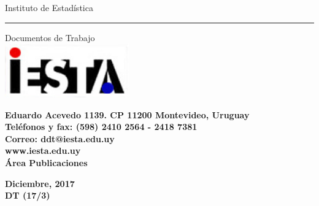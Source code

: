 \documentclass[12pt]{article}\usepackage[]{graphicx}\usepackage[]{color}
\begin{document}
\pagebreak
\thispagestyle{empty}
\begin{center}

\vspace{1.5 cm}
{\Huge Instituto de Estadística} 
\noindent\rule{18cm}{0.4pt}

\vspace{0.5 cm}
\pagestyle{fancy}
{\Huge Documentos de Trabajo}\\
\thispagestyle{empty}
\vspace{1.5 cm}
\includegraphics[width=0.40\textwidth]{logo_iesta.png}

\thispagestyle{empty}
\vspace{4.5 cm}

\begin{flushright}
	\textbf{\large Eduardo Acevedo 1139. CP 11200
		Montevideo, Uruguay\\
		Teléfonos y fax: (598) 2410 2564 - 2418 7381\\
		Correo: ddt@iesta.edu.uy\\
		www.iesta.edu.uy\\
		Área Publicaciones\\}	
\end{flushright}

\vspace{1.5 cm}
\large\textbf{Diciembre, 2017}\\
\large\textbf{DT (17/3)}
\end{center}
\end{document}
